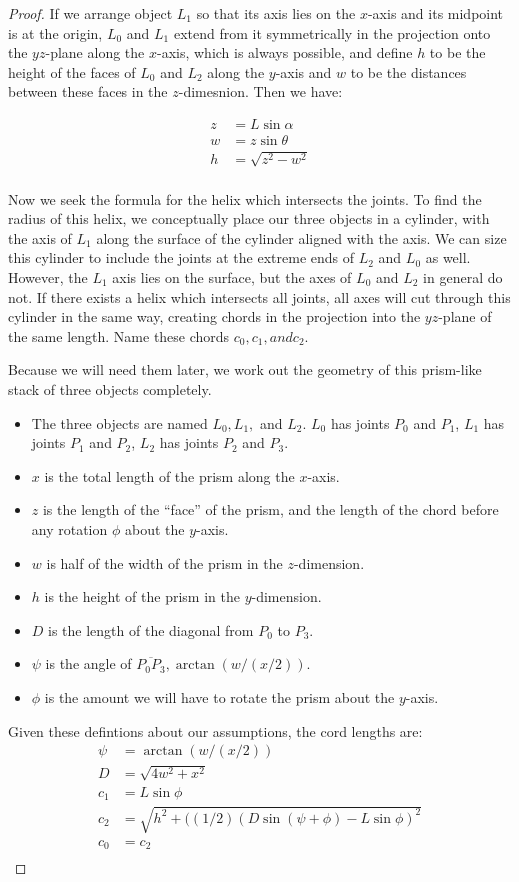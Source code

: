 \documentclass[11pt]{article}
\begin{document}
{\begin{proof}
  If we arrange object $L_1$ so that its axis lies on the $x$-axis and its midpoint is at the origin,
  $L_0$ and $L_1$ extend from it symmetrically in the projection onto the $yz$-plane along the $x$-axis, which is always possible, and define $h$ to be the height of the faces of $L_0$ and $L_2$ along the $y$-axis
  and $w$ to be the distances between these faces in the $z$-dimesnion. Then we have:

  \begin{align*}
z &= L \sin{\alpha} \\
w &= z \sin{\theta} \\
h &= \sqrt{z^2 - w^2} \\
  \end{align*}

  Now we seek the formula for the helix which intersects the joints. To find the radius of this helix,
  we conceptually place our three objects in a cylinder, with the axis of $L_1$ along the surface
  of the cylinder aligned with the axis. We can size this cylinder to include the joints at the
  extreme ends of $L_2$ and $L_0$ as well. However, the $L_1$ axis lies on the surface, but
  the axes of $L_0$ and $L_2$ in general do not. If there exists a helix which intersects all
  joints, all axes will cut through this cylinder in the same way, creating chords in the projection
  into the $yz$-plane of the same length. Name these chords $c_0,c_1, and c_2$.

  Because we will need them later, we work out the geometry of this prism-like stack of three
  objects completely.
  \begin{itemize}
  \item The three objects are named $L_0,L_1,$ and $L_2$.
    $L_0$ has joints $P_0$ and $P_1$,
    $L_1$ has joints $P_1$ and $P_2$,
    $L_2$ has joints $P_2$ and $P_3$.
  \item  $x$ is the total length of the prism along the $x$-axis.
  \item $z$ is the length of the ``face'' of the prism, and the length
    of the chord before any rotation $\phi$ about the $y$-axis.
  \item $w$ is half of the width of the prism in the $z$-dimension.
  \item $h$ is the height of the prism in the $y$-dimension.
  \item $D$ is the length of the diagonal from $P_0$ to $P_3$.
  \item $\psi$ is the angle of $\overline{P_0P_3}, \arctan{(w/(x/2))}$.
    \item $\phi$ is the amount we will have to rotate the prism about the $y$-axis.
    \end{itemize}
Given these defintions about our assumptions, the cord lengths are:
\begin{align*}
  \psi &= \arctan{(w/(x/2))} \\
D &= \sqrt{4w^2+x^2} \\
c_1 &= L \sin{\phi} \\
c_2 &= \sqrt{h^2 + ((1/2)(D\sin{(\psi+\phi)}-L\sin{\phi})^2}  \\
c_0 &= c_2 \\
  \end{align*}
  


\end{proof}}
\end{document}
